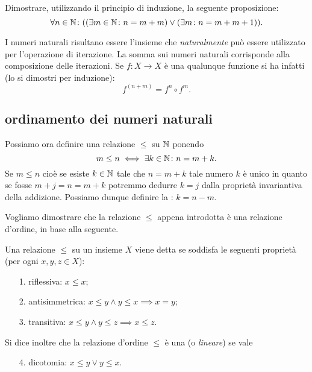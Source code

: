 \begin{exercise}
  Dimostrare, utilizzando il principio di induzione, la seguente 
  proposizione:
  \[
  \forall n\in {\mathbb N}\colon {\left( {\left( \exists m\in {\mathbb N}\colon n = m + m \right)} 
  \lor {\left( \exists m\colon n = m + m + 1 \right)} \right)}.  
  \]
\end{exercise}

I numeri naturali risultano essere l'insieme che \emph{naturalmente} può 
essere utilizzato per l'operazione di iterazione. La somma sui numeri 
naturali corrisponde alla composizione delle iterazioni. Se 
$f\colon X\to X$ è una qualunque funzione si ha infatti (lo si dimostri per induzione):
\[
   f^(n+m) = f^n \circ f^m.
\]


\subsection{ordinamento dei numeri naturali}

Possiamo ora definire una relazione $\le$ su ${\mathbb N}$ ponendo 
\[
  m \le n \iff \exists k\in {\mathbb N}\colon n = m+k.  
\]
Se $m\le n$ cioè se esiste $k\in {\mathbb N}$ tale che $n=m+k$ tale numero 
$k$ è unico in quanto se fosse $m+j=n=m+k$ potremmo dedurre $k=j$
dalla proprietà invariantiva della addizione. 
Possiamo dunque definire la : $k=n-m$.


Vogliamo dimostrare che la relazione $\le$ appena introdotta 
è una relazione d'ordine, in base alla seguente.

\begin{definition}
  \label{def:ordine}%
  Una relazione
  $\le$ su un insieme $X$ viene detta
  se soddisfa le seguenti proprietà (per ogni $x,y,z\in X$):
  \begin{enumerate}
    \item[1.] riflessiva: $x\le x$;
    \item[2.] antisimmetrica: $x\le y \land y\le x \implies x=y$;
    \item[3.] transitiva: $x\le y \land y\le z \implies x\le z$.
  \end{enumerate}
  Si dice inoltre che la relazione d'ordine $\le$
  è una  (o \emph{lineare}) 
  se vale
  \begin{enumerate}
    \item[4.] dicotomia: $x\le y \lor y\le x$.
  \end{enumerate}
\end{definition}

